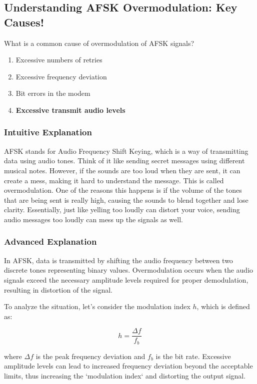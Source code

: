\subsection{Understanding AFSK Overmodulation: Key Causes!}

\begin{tcolorbox}[colback=white!10!white, colframe=black!75!black, title={Question ID: E8D07}]
What is a common cause of overmodulation of AFSK signals?
\begin{enumerate}[label=\Alph*.]
    \item Excessive numbers of retries
    \item Excessive frequency deviation
    \item Bit errors in the modem
    \item \textbf{Excessive transmit audio levels}
\end{enumerate}
\end{tcolorbox}

\subsubsection{Intuitive Explanation}
AFSK stands for Audio Frequency Shift Keying, which is a way of transmitting data using audio tones. Think of it like sending secret messages using different musical notes. However, if the sounds are too loud when they are sent, it can create a mess, making it hard to understand the message. This is called overmodulation. One of the reasons this happens is if the volume of the tones that are being sent is really high, causing the sounds to blend together and lose clarity. Essentially, just like yelling too loudly can distort your voice, sending audio messages too loudly can mess up the signals as well.

\subsubsection{Advanced Explanation}
In AFSK, data is transmitted by shifting the audio frequency between two discrete tones representing binary values. Overmodulation occurs when the audio signals exceed the necessary amplitude levels required for proper demodulation, resulting in distortion of the signal. 

To analyze the situation, let's consider the modulation index \( h \), which is defined as:

\[
h = \frac{\Delta f}{f_b}
\]

where \( \Delta f \) is the peak frequency deviation and \( f_b \) is the bit rate. Excessive amplitude levels can lead to increased frequency deviation beyond the acceptable limits, thus increasing the `modulation index` and distorting the output signal.

